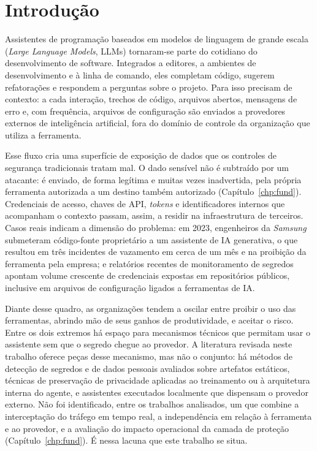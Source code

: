 \chapter{Introdução}\label{chp:intro}

Assistentes de programação baseados em modelos de linguagem de grande escala (\textit{Large Language Models}, LLMs) tornaram-se parte do cotidiano do desenvolvimento de software. Integrados a editores, a ambientes de desenvolvimento e à linha de comando, eles completam código, sugerem refatorações e respondem a perguntas sobre o projeto. Para isso precisam de contexto: a cada interação, trechos de código, arquivos abertos, mensagens de erro e, com frequência, arquivos de configuração são enviados a provedores externos de inteligência artificial, fora do domínio de controle da organização que utiliza a ferramenta.

Esse fluxo cria uma superfície de exposição de dados que os controles de segurança tradicionais tratam mal. O dado sensível não é subtraído por um atacante: é enviado, de forma legítima e muitas vezes inadvertida, pela própria ferramenta autorizada a um destino também autorizado (Capítulo~\ref{chp:fund}). Credenciais de acesso, chaves de API, \textit{tokens} e identificadores internos que acompanham o contexto passam, assim, a residir na infraestrutura de terceiros. Casos reais indicam a dimensão do problema: em 2023, engenheiros da \textit{Samsung} submeteram código-fonte proprietário a um assistente de IA generativa, o que resultou em três incidentes de vazamento em cerca de um mês e na proibição da ferramenta pela empresa; e relatórios recentes de monitoramento de segredos apontam volume crescente de credenciais expostas em repositórios públicos, inclusive em arquivos de configuração ligados a ferramentas de IA.

Diante desse quadro, as organizações tendem a oscilar entre proibir o uso das ferramentas, abrindo mão de seus ganhos de produtividade, e aceitar o risco. Entre os dois extremos há espaço para mecanismos técnicos que permitam usar o assistente sem que o segredo chegue ao provedor. A literatura revisada neste trabalho oferece peças desse mecanismo, mas não o conjunto: há métodos de detecção de segredos e de dados pessoais avaliados sobre artefatos estáticos, técnicas de preservação de privacidade aplicadas ao treinamento ou à arquitetura interna do agente, e assistentes executados localmente que dispensam o provedor externo. Não foi identificado, entre os trabalhos analisados, um que combine a interceptação do tráfego em tempo real, a independência em relação à ferramenta e ao provedor, e a avaliação do impacto operacional da camada de proteção (Capítulo~\ref{chp:fund}). É nessa lacuna que este trabalho se situa.

